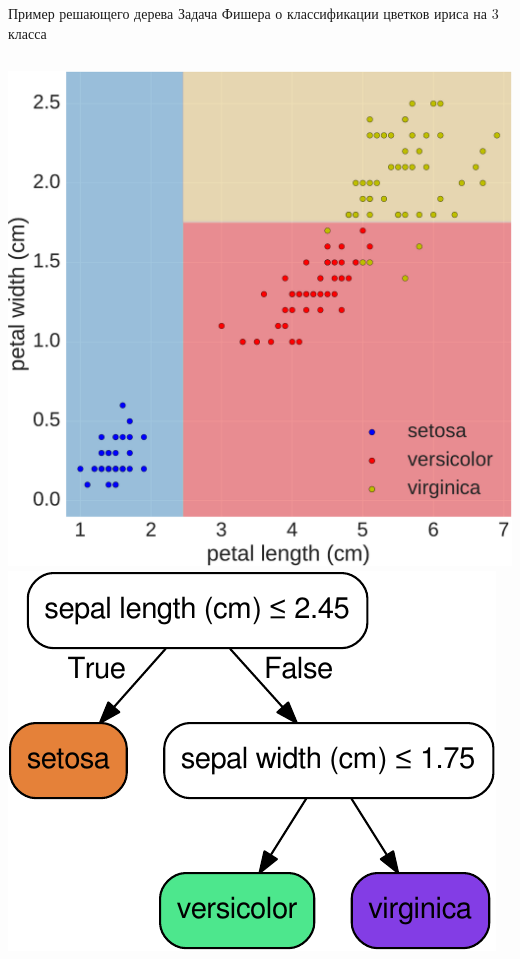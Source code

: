 \documentclass{beamer}
\begin{document}
\begin{frame}{Пример решающего дерева}
Задача Фишера о классификации цветков ириса на 3 класса

\begin{columns}
\includegraphics[width=\textwidth]{../fig/iris_ds-crop.pdf}
\includegraphics[width=\textwidth]{../fig/iris_dt-crop.pdf}
\end{columns}
\end{frame}
\end{document}
